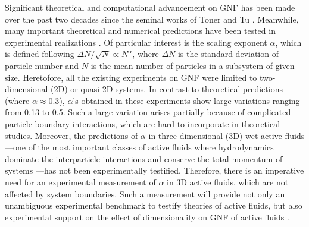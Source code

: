 \documentclass[twocolumn,aps,prl,amsmath,amssymb,longbibliography]{revtex4-2}
\begin{document}
Significant theoretical and computational advancement on GNF has been made over the past two decades since the seminal works of Toner and Tu \cite{Toner1995,Tu1998,Toner1998,AditiSimha2002,Ramaswamy2003,Toner2005,Chate2008,Mishra2010,
Dey2012,Saintillan2012,Saintillan2013,Ngo2014,Mahault2019}. Meanwhile, many important theoretical and numerical predictions have been tested in experimental realizations
\cite{Narayan2007, Aranson2008, Deseigne2010, Zhang2010, Schaller2013,
Nishiguchi2017, Kawaguchi2017, Palacci2013}.
Of particular interest is the scaling exponent $\alpha$, which is defined following $\Delta N /\sqrt N \propto N^\alpha$, where $\Delta N$ is the standard deviation of particle number and $N$ is the mean number of particles in a subsystem of given size. Heretofore, all the existing experiments on GNF were limited to two-dimensional (2D) or quasi-2D systems. In contrast to theoretical predictions (where $\alpha \approx 0.3$), $\alpha$'s obtained in these experiments show large variations ranging from 0.13 to 0.5. Such a large variation arises partially because of complicated particle-boundary interactions, which are hard to incorporate in theoretical studies. Moreover, the predictions of $\alpha$ in three-dimensional (3D) wet active fluids---one of the most important classes of active fluids where hydrodynamics dominate the interparticle interactions and conserve the total momentum of systems \cite{Marchetti2013}---has not been experimentally testified. Therefore, there is an imperative need for an experimental measurement of $\alpha$ in 3D active fluids, which are not affected by system boundaries. Such a measurement will provide not only an unambiguous experimental benchmark to testify theories of active fluids, but also experimental support on the effect of dimensionality on GNF of active fluids \cite{Marchetti2013}.
\end{document}
